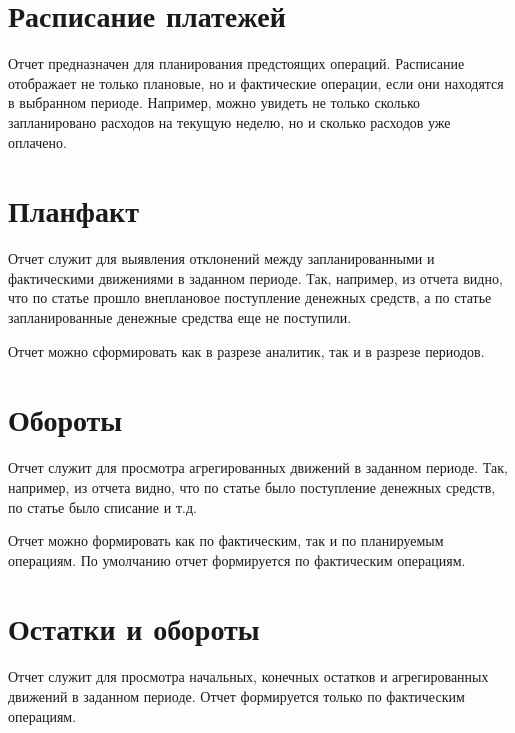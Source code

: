 \documentclass[a4paper,10pt,russian]{sphinxmanual}
\begin{document}
\section{Расписание платежей}
\label{\detokenize{reports:id2}}
\sphinxAtStartPar
Отчет предназначен для планирования предстоящих операций. Расписание отображает не только плановые, но и фактические
операции, если они находятся в выбранном периоде. Например, можно увидеть не только сколько запланировано расходов
на текущую неделю, но и сколько расходов уже оплачено.

\noindent{}
\noindent{}
\noindent{}


\section{План\sphinxhyphen{}факт}
\label{\detokenize{reports:id3}}
\sphinxAtStartPar
Отчет служит для выявления отклонений между запланированными и фактическими движениями в заданном периоде. Так, например,
из отчета видно, что по статье  прошло внеплановое поступление денежных средств,
а по статье 
запланированные денежные средства еще не поступили.

\sphinxAtStartPar
Отчет можно сформировать как в разрезе аналитик, так и в разрезе периодов.


\section{Обороты}
\label{\detokenize{reports:id4}}
\sphinxAtStartPar
Отчет служит для просмотра агрегированных движений в заданном периоде. Так, например,
из отчета видно, что по статье  было поступление денежных средств, по статье 
было списание и т.д.

\sphinxAtStartPar
Отчет можно формировать как по фактическим, так и по планируемым операциям. По умолчанию отчет формируется
по фактическим операциям.


\section{Остатки и обороты}
\label{\detokenize{reports:id5}}
\sphinxAtStartPar
Отчет служит для просмотра начальных, конечных остатков и агрегированных движений в заданном периоде. Отчет формируется
только по фактическим операциям.
\end{document}
